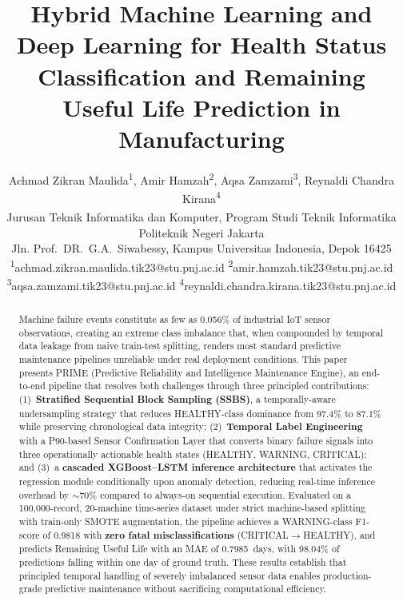 \documentclass[conference]{IEEEtran}
\begin{document}
\title{Hybrid Machine Learning and Deep Learning for Health Status
       Classification and Remaining Useful Life Prediction in Manufacturing}

\author{
Achmad Zikran Maulida\textsuperscript{1},
Amir Hamzah\textsuperscript{2},
Aqsa Zamzami\textsuperscript{3},
Reynaldi Chandra Kirana\textsuperscript{4} \\

\textsuperscript{}Jurusan Teknik Informatika dan Komputer,
Program Studi Teknik Informatika \\
Politeknik Negeri Jakarta \\
Jln. Prof.\ DR.\ G.A.\ Siwabessy, Kampus Universitas Indonesia, Depok 16425 \\

\textsuperscript{1}achmad.zikran.maulida.tik23@stu.pnj.ac.id \quad
\textsuperscript{2}amir.hamzah.tik23@stu.pnj.ac.id \\
\textsuperscript{3}aqsa.zamzami.tik23@stu.pnj.ac.id \quad
\textsuperscript{4}reynaldi.chandra.kirana.tik23@stu.pnj.ac.id
}
\maketitle

\begin{abstract}
Machine failure events constitute as few as 0.056\% of industrial
IoT sensor observations, creating an extreme class imbalance that,
when compounded by temporal data leakage from naive train-test
splitting, renders most standard predictive maintenance pipelines
unreliable under real deployment conditions. This paper presents
PRIME (Predictive Reliability and Intelligence Maintenance Engine),
an end-to-end pipeline that resolves both challenges through three
principled contributions: (1)~\textbf{Stratified Sequential Block
Sampling (SSBS)}, a temporally-aware undersampling strategy that
reduces HEALTHY-class dominance from 97.4\% to 87.1\% while
preserving chronological data integrity; (2)~\textbf{Temporal Label
Engineering} with a P90-based Sensor Confirmation Layer that
converts binary failure signals into three operationally actionable
health states (HEALTHY, WARNING, CRITICAL); and (3)~a
\textbf{cascaded XGBoost--LSTM inference architecture} that
activates the regression module conditionally upon anomaly
detection, reducing real-time inference overhead by
$\sim$70\% compared to always-on sequential execution. Evaluated
on a 100,000-record, 20-machine time-series dataset under strict
machine-based splitting with train-only SMOTE augmentation, the
pipeline achieves a WARNING-class F1-score of 0.9818 with
\textbf{zero fatal misclassifications} (CRITICAL$\rightarrow$HEALTHY),
and predicts Remaining Useful Life with an MAE of 0.7985~days,
with 98.04\% of predictions falling within one day of ground truth.
These results establish that principled temporal handling of
severely imbalanced sensor data enables production-grade predictive
maintenance without sacrificing computational efficiency.
\end{abstract}
\end{document}
